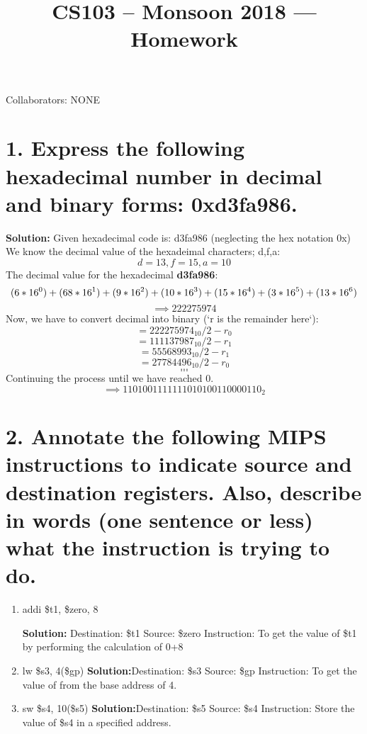 \documentclass[11pt]{article}
\title{CS103 -- Monsoon 2018 --- Homework \Homework}
\author{\Name 
}
\date{}
\newenvironment{qparts}{\begin{enumerate}[{(}a{)}]}{\end{enumerate}}
\begin{document}
\maketitle

Collaborators: NONE

\section*{1. Express the following hexadecimal number in decimal and binary forms: 0xd3fa986.}
\begin{qparts}

\textbf{Solution: } Given hexadecimal code is: d3fa986 (neglecting the hex notation 0x)
We know the decimal value of the hexadeimal characters; d,f,a:
\[d=13, f=15, a=10\]
The decimal value for the hexadecimal \textbf{d3fa986}: \[\small( 6*16^0\small) + \small( 68*16^1\small) + \small( 9*16^2\small) + \small( 10*16^3\small) + \small( 15*16^4\small) + \small( 3*16^5\small) + \small( 13*16^6\small)\]
\[\implies 222275974\]
\newline
Now, we have to convert decimal into binary
(`r is the remainder here`): 
\[= 222275974_{10} / 2 - r_0\]
\[= 111137987_{10} / 2 - r_1\]
\[= 55568993_{10} / 2 - r_1\]
\[= 27784496_{10} / 2 - r_0\]
\[...\]
\[...\]
\newline
Continuing the process until we have reached 0.
\[\implies 1101001111111010100110000110_{2}\]

\end{qparts}


\section*{2. Annotate the following MIPS instructions to indicate source and destination registers. Also, describe in words (one sentence or less) what the instruction is trying to do. }

\begin{qparts}
\item addi \$t1, \$zero, 8

\textbf{Solution:} Destination: \$t1 \newline
Source: \$zero
\newline 
Instruction: To get the value of \$t1 by performing the calculation of 0+8

\item lw \$s3, 4(\$gp)
\textbf{Solution:}Destination: \$s3
\newline
Source: \$gp
\newline
Instruction: To get the value of  from the base address of 4.


\item sw \$s4, 10(\$s5)
\textbf{Solution:}Destination: \$s5
\newline
Source: \$s4
\newline
Instruction: Store the value of \$s4 in a specified address.

\end{qparts}
\end{document}
